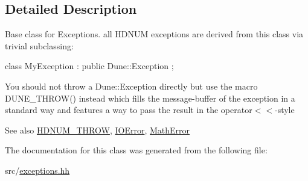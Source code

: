 \subsection{Detailed Description}
Base class for Exceptions. all HDNUM exceptions are derived from this class via trivial subclassing:


\begin{DoxyCode}
        class MyException : public Dune::Exception {};
\end{DoxyCode}


You should not {\ttfamily throw} a Dune::Exception directly but use the macro DUNE\_\-THROW() instead which fills the message-\/buffer of the exception in a standard way and features a way to pass the result in the operator$<$$<$-\/style

\begin{DoxySeeAlso}{See also}
\hyperlink{exceptions_8hh_a7385bc4ca18aaff3f509a30bde2567c0}{HDNUM\_\-THROW}, \hyperlink{classhdnum_1_1IOError}{IOError}, \hyperlink{classhdnum_1_1MathError}{MathError} 
\end{DoxySeeAlso}


The documentation for this class was generated from the following file:\begin{DoxyCompactItemize}
\item 
src/\hyperlink{exceptions_8hh}{exceptions.hh}\end{DoxyCompactItemize}

